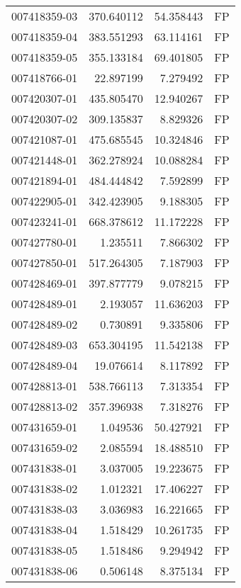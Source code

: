 \begin{tabular}{lrrl}
007418359-03 &  370.640112 &      54.358443 &   FP \\
007418359-04 &  383.551293 &      63.114161 &   FP \\
007418359-05 &  355.133184 &      69.401805 &   FP \\
007418766-01 &   22.897199 &       7.279492 &   FP \\
007420307-01 &  435.805470 &      12.940267 &   FP \\
007420307-02 &  309.135837 &       8.829326 &   FP \\
007421087-01 &  475.685545 &      10.324846 &   FP \\
007421448-01 &  362.278924 &      10.088284 &   FP \\
007421894-01 &  484.444842 &       7.592899 &   FP \\
007422905-01 &  342.423905 &       9.188305 &   FP \\
007423241-01 &  668.378612 &      11.172228 &   FP \\
007427780-01 &    1.235511 &       7.866302 &   FP \\
007427850-01 &  517.264305 &       7.187903 &   FP \\
007428469-01 &  397.877779 &       9.078215 &   FP \\
007428489-01 &    2.193057 &      11.636203 &   FP \\
007428489-02 &    0.730891 &       9.335806 &   FP \\
007428489-03 &  653.304195 &      11.542138 &   FP \\
007428489-04 &   19.076614 &       8.117892 &   FP \\
007428813-01 &  538.766113 &       7.313354 &   FP \\
007428813-02 &  357.396938 &       7.318276 &   FP \\
007431659-01 &    1.049536 &      50.427921 &   FP \\
007431659-02 &    2.085594 &      18.488510 &   FP \\
007431838-01 &    3.037005 &      19.223675 &   FP \\
007431838-02 &    1.012321 &      17.406227 &   FP \\
007431838-03 &    3.036983 &      16.221665 &   FP \\
007431838-04 &    1.518429 &      10.261735 &   FP \\
007431838-05 &    1.518486 &       9.294942 &   FP \\
007431838-06 &    0.506148 &       8.375134 &   FP \\

\end{tabular}
